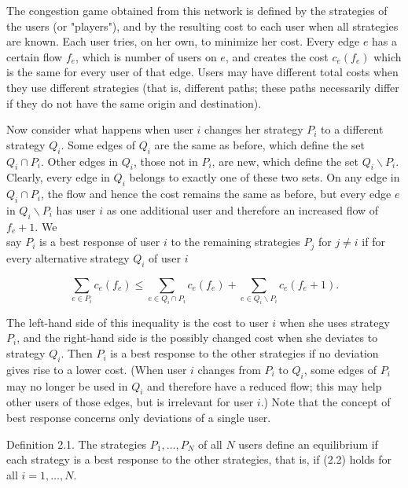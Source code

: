 \documentclass[12pt]{article}
\begin{document}
The congestion game obtained from this network is defined by the strategies of the users (or "players"), and by the resulting cost to each user when all strategies are known. Each user tries, on her own, to minimize her cost. Every edge $e$ has a certain flow $f_{e}$, which is number of users on $e$, and creates the cost $c_{e}\left(f_{e}\right)$ which is the same for every user of that edge. Users may have different total costs when they use different strategies (that is, different paths; these paths necessarily differ if they do not have the same origin and destination).

Now consider what happens when user $i$ changes her strategy $P_{i}$ to a different strategy $Q_{i}$. Some edges of $Q_{i}$ are the same as before, which define the set $Q_{i} \cap P_{i}$. Other edges in $Q_{i}$, those not in $P_{i}$, are new, which define the set $Q_{i} \backslash P_{i}$. Clearly, every edge in $Q_{i}$ belongs to exactly one of these two sets. On any edge in $Q_{i} \cap P_{i}$, the flow and hence the cost remains the same as before, but every edge $e$ in $Q_{i} \backslash P_{i}$ has user $i$ as one additional user and therefore an increased flow of $f_{e}+1$. We\\
say $P_{i}$ is a best response of user $i$ to the remaining strategies $P_{j}$ for $j \neq i$ if for every alternative strategy $Q_{i}$ of user $i$


\begin{equation*}
\sum_{e \in P_{i}} c_{e}\left(f_{e}\right) \leq \sum_{e \in Q_{i} \cap P_{i}} c_{e}\left(f_{e}\right)+\sum_{e \in Q_{i} \backslash P_{i}} c_{e}\left(f_{e}+1\right) . \tag{2.2}
\end{equation*}


The left-hand side of this inequality is the cost to user $i$ when she uses strategy $P_{i}$, and the right-hand side is the possibly changed cost when she deviates to strategy $Q_{i}$. Then $P_{i}$ is a best response to the other strategies if no deviation gives rise to a lower cost. (When user $i$ changes from $P_{i}$ to $Q_{i}$, some edges of $P_{i}$ may no longer be used in $Q_{i}$ and therefore have a reduced flow; this may help other users of those edges, but is irrelevant for user $i$.) Note that the concept of best response concerns only deviations of a single user.

Definition 2.1. The strategies $P_{1}, \ldots, P_{N}$ of all $N$ users define an equilibrium if each strategy is a best response to the other strategies, that is, if (2.2) holds for all $i=1, \ldots, N$.
\end{document}
